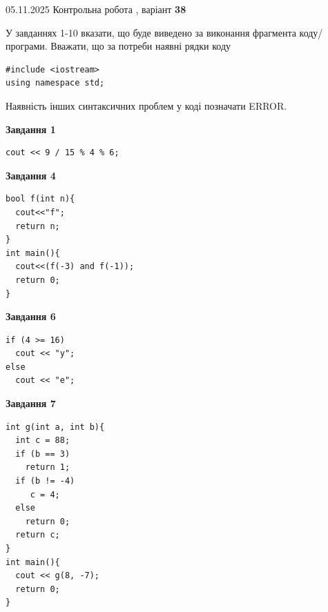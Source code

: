 \documentclass[12pt, ukrainian]{article}
\begin{document}
{\Large{05.11.2025 Контрольна робота , варіант  \No \textbf { 38 }\par}}
{
\begin {large}
У завданнях 1-10 вказати, що буде виведено за виконання фрагмента коду/про\-гра\-ми.
Вважати, що за потреби наявні рядки коду
\begin{verbatim}
#include <iostream>
using namespace std;
\end{verbatim}
Наявність інших синтаксичних проблем у коді позначати ERROR.

\begin{minipage}[t]{7.0cm}

\begin{center}
\textbf{Завдання 1}
\end{center}
\vspace{-8mm}

\begin{verbatim}
cout << 9 / 15 % 4 % 6;
\end{verbatim}



\begin{center}
\textbf{Завдання 4}
\end{center}
\vspace{-8mm}

\begin{verbatim}
bool f(int n){
  cout<<"f";
  return n;
}
int main(){
  cout<<(f(-3) and f(-1));
  return 0;
}
\end{verbatim}



\begin{center}
\textbf{Завдання 6}
\end{center}
\vspace{-8mm}

\begin{verbatim}
if (4 >= 16)
  cout << "y";
else
  cout << "e";
\end{verbatim}



\begin{center}
\textbf{Завдання 7}
\end{center}
\vspace{-8mm}

\begin{verbatim}
int g(int a, int b){
  int c = 88;
  if (b == 3)
    return 1;
  if (b != -4)
     c = 4;
  else
    return 0;
  return c;
}
int main(){
  cout << g(8, -7);
  return 0;
}
\end{verbatim}


\end{minipage}
\end{large}}
\end{document}
